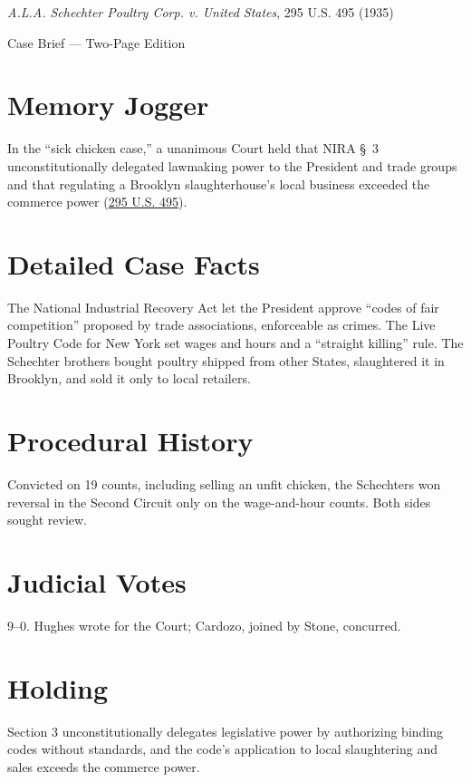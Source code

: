 \documentclass[12pt]{article}
\begin{document}
\begin{center}
{\LARGE \textit{A.L.A. Schechter Poultry Corp. v. United States}, 295 U.S. 495 (1935)\par}
\vspace{0.5em}
{\large Case Brief --- Two-Page Edition\par}
\end{center}

\section{Memory Jogger}
In the ``sick chicken case,'' a unanimous Court held that NIRA \S~3 unconstitutionally delegated lawmaking power to the President and trade groups and that regulating a Brooklyn slaughterhouse's local business exceeded the commerce power (\href{https://supreme.justia.com/cases/federal/us/295/495/}{295 U.S. 495}).

\section{Detailed Case Facts}
The National Industrial Recovery Act let the President approve ``codes of fair competition'' proposed by trade associations, enforceable as crimes. The Live Poultry Code for New York set wages and hours and a ``straight killing'' rule. The Schechter brothers bought poultry shipped from other States, slaughtered it in Brooklyn, and sold it only to local retailers.

\section{Procedural History}
Convicted on 19 counts, including selling an unfit chicken, the Schechters won reversal in the Second Circuit only on the wage-and-hour counts. Both sides sought review.

\section{Judicial Votes}
9--0. Hughes wrote for the Court; Cardozo, joined by Stone, concurred.

\section{Holding}
Section 3 unconstitutionally delegates legislative power by authorizing binding codes without standards, and the code's application to local slaughtering and sales exceeds the commerce power.
\end{document}
